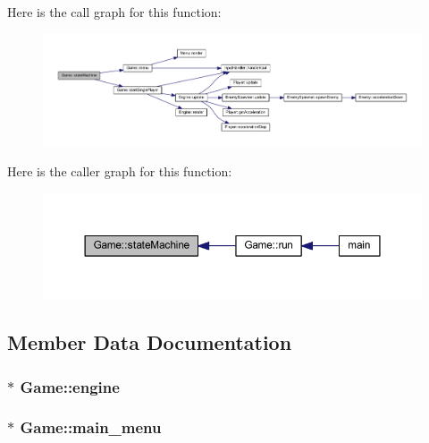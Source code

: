 Here is the call graph for this function\+:
\nopagebreak
\begin{figure}[H]
\begin{center}
\leavevmode
\includegraphics[width=350pt]{class_game_a8bc94200bfbf0421b83b7c2b2b45da72_cgraph}
\end{center}
\end{figure}




Here is the caller graph for this function\+:
\nopagebreak
\begin{figure}[H]
\begin{center}
\leavevmode
\includegraphics[width=350pt]{class_game_a8bc94200bfbf0421b83b7c2b2b45da72_icgraph}
\end{center}
\end{figure}




\subsection{Member Data Documentation}
\hypertarget{class_game_a194ef5476cf228d8960bab095b37aa23}{}
\subsubsection[{engine}]{$\ast$ Game\+::engine}\label{class_game_a194ef5476cf228d8960bab095b37aa23}
\hypertarget{class_game_a4b9b7a9db87b0ede3b39e853d69bbe1c}{}
\subsubsection[{main\+\_\+menu}]{$\ast$ Game\+::main\+\_\+menu}\label{class_game_a4b9b7a9db87b0ede3b39e853d69bbe1c}
\hypertarget{class_game_af851bd0efbb65bb637f434f90bcdcae6}{}
